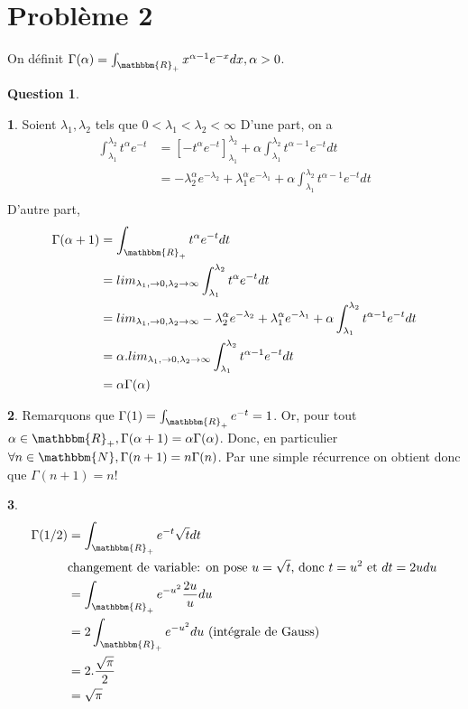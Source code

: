 \documentclass[12pt]{article}
\newcommand{\R}{\mathbbm{R}}
\newcommand{\N}{\mathbbm{N}}
\newcommand{\1}{\mathbbm{1}}
\theoremstyle{definition}\newtheorem{defn}{Définition}
\theoremstyle{definition}\newtheorem{exm}{Exemple}
\theoremstyle{definition}\newtheorem{rem}{Remarque}
\theoremstyle{definition}\newtheorem{algo}{Algorithme}
\theoremstyle{remark}\newtheorem{exo}{Exercice}
\theoremstyle{remark}\newtheorem{nota}{Notation}
\theoremstyle{definition}\newtheorem{1q}{Question}
\theoremstyle{definition}\newtheorem{2q}{Question}
\theoremstyle{definition}\newtheorem{3q}{Question}
\theoremstyle{definition}\newtheorem{4q}{Question}
\theoremstyle{definition}\newtheorem{2qs1}{}
\theoremstyle{definition}\newtheorem{2qs2}{}
\theoremstyle{definition}\newtheorem{2qs3}{}
\theoremstyle{definition}\newtheorem{2qs4}{}
\theoremstyle{definition}\newtheorem{4qs2}{}
\theoremstyle{definition}\newtheorem{4qs3}{}
\begin{document}

\section{Problème 2}

On définit $\Gamma(\alpha) = \int_{\R_+}x^{\alpha-1}e^{-x}dx, \alpha >0$.

\begin{2q}
\begin{2qs1}
Soient $\lambda_1, \lambda_2$ tels que $0 < \lambda_1 < \lambda_2 <\infty$\newline
D'une part, on a
\begin{align*}
\int_{\lambda_1}^{\lambda_2}t^\alpha e^{-t} &= [-t^\alpha e^{-t}]_{\lambda_1}^{\lambda_2} + \alpha\int_{\lambda_1}^{\lambda_2}t^{\alpha-1}e^{-t}dt\\
&= -\lambda_2^\alpha e^{-\lambda_2} +\lambda_1^\alpha e^{-\lambda_1} +\alpha\int_{\lambda_1}^{\lambda_2}t^{\alpha-1}e^{-t}dt\\
\end{align*}
D'autre part, 
\begin{align*}
\Gamma(\alpha+1) &= \int_{\R_+}t^\alpha e^{-t}dt \\
&= lim_{\lambda_1,  \rightarrow 0, \lambda_2 \rightarrow \infty} \int_{\lambda_1}^{\lambda_2}t^{\alpha}e^{-t}dt\\
&=  lim_{\lambda_1,  \rightarrow 0, \lambda_2 \rightarrow \infty} -\lambda_2^\alpha e^{-\lambda_2} +\lambda_1^\alpha e^{-\lambda_1} +\alpha\int_{\lambda_1}^{\lambda_2}t^{\alpha-1}e^{-t}dt\\
&= \alpha.lim_{\lambda_1,  \rightarrow 0, \lambda_2 \rightarrow \infty}\int_{\lambda_1}^{\lambda_2}t^{\alpha-1}e^{-t}dt\\
&=\alpha\Gamma(\alpha)
\end{align*}
\end{2qs1}


\begin{2qs1}
Remarquons que $\Gamma(1)=\int_{\R_+}e^{-t}=1$.\newline
Or, pour tout $\alpha \in \R_+, \Gamma(\alpha+1)=\alpha\Gamma(\alpha)$. Donc, en particulier $\forall n\in\N, \Gamma(n+1) = n\Gamma(n)$. \newline
Par une simple récurrence on obtient donc que $\Gamma(n+1)=n!$
\end{2qs1}

\begin{2qs1}
\begin{align*}
\Gamma(1/2) &= \int_{\R_+}e^{-t}\sqrt{t}dt\\
&\text{changement de variable: on pose $u=\sqrt{t}$, donc $t=u^2$ et $dt=2udu$}\\
&=\int_{\R_+}e^{-u^2}\frac{2u}{u}du\\
&= 2\int_{\R_+}e^{-u^2}du \text{  (intégrale de Gauss)}\\
&=2.\frac{\sqrt{\pi}}{2}\\
&= \sqrt{\pi}
\end{align*}
\end{2qs1}
\end{2q}
\end{document}
